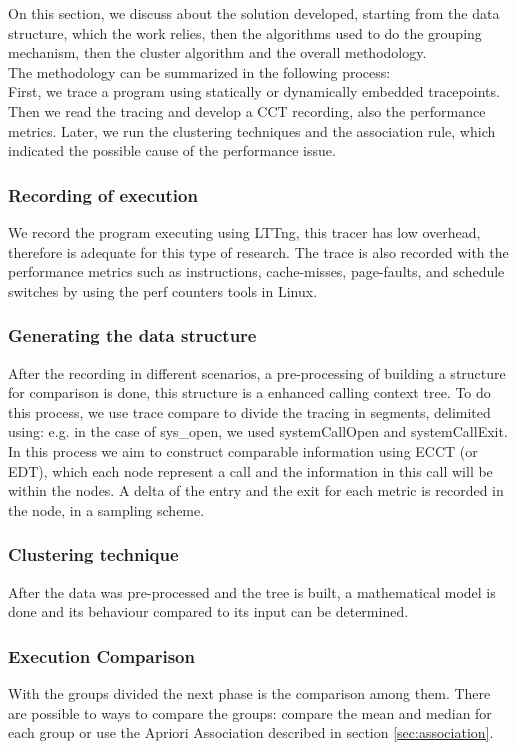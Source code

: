 On this section, we discuss about the solution developed, starting from the data structure, which the work relies, then the algorithms used to do the grouping mechanism, then the cluster algorithm and the overall methodology. \\

  The methodology can be summarized in the following process:\\
  First, we trace a program using statically or dynamically embedded tracepoints. Then we read the tracing and develop a CCT recording, also the performance metrics. Later, we run the clustering techniques and the association rule, which indicated the possible cause of the performance issue.
  
    \subsubsection{Recording of execution}
    We record the program executing using LTTng, this tracer has low overhead, therefore is adequate for this type of research. 
    The trace is also recorded with the performance metrics such as instructions, cache-misses, page-faults, and schedule switches by using the perf counters tools in Linux.
    
    \subsubsection{Generating the data structure}
    After the recording in different scenarios, a pre-processing of building a structure for comparison is done, this structure is a enhanced calling context tree. 
    To do this process, we use trace compare to divide the tracing in segments, delimited using: e.g. in the case of sys\_open, we used systemCallOpen and systemCallExit.
    In this process we aim to construct comparable information using ECCT (or EDT), which each node represent a call and the information in this call will be within the nodes. A delta of the entry and the exit for each metric is recorded in the node, in a sampling scheme.
    
    \subsubsection{Clustering technique}
    After the data was pre-processed and the tree is built, a mathematical model is done and its behaviour compared to its input can be determined. 
    
    \subsubsection{Execution Comparison}
    With the groups divided the next phase is the comparison among them. There are possible to ways to compare the groups: compare the mean and median for each group or use the Apriori Association described in section \ref{sec:association}.
    
